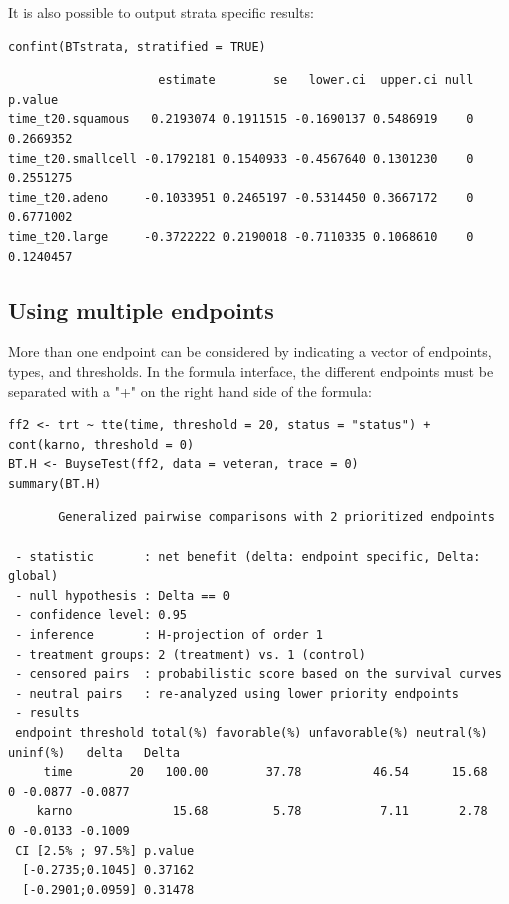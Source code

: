 \documentclass[12pt]{article}
\begin{document}
It is also possible to output strata specific results:
\lstset{language=r,label= ,caption= ,captionpos=b,numbers=none}
\begin{lstlisting}
confint(BTstrata, stratified = TRUE)
\end{lstlisting}

\begin{verbatim}
                     estimate        se   lower.ci  upper.ci null   p.value
time_t20.squamous   0.2193074 0.1911515 -0.1690137 0.5486919    0 0.2669352
time_t20.smallcell -0.1792181 0.1540933 -0.4567640 0.1301230    0 0.2551275
time_t20.adeno     -0.1033951 0.2465197 -0.5314450 0.3667172    0 0.6771002
time_t20.large     -0.3722222 0.2190018 -0.7110335 0.1068610    0 0.1240457
\end{verbatim}


\clearpage


\subsection{Using multiple endpoints}
\label{sec:org0e12525}
More than one endpoint can be considered by indicating a vector of
endpoints, types, and thresholds. In the formula interface, the
different endpoints must be separated with a "+" on the right hand
side of the formula:
\lstset{language=r,label= ,caption= ,captionpos=b,numbers=none}
\begin{lstlisting}
ff2 <- trt ~ tte(time, threshold = 20, status = "status") + cont(karno, threshold = 0)
BT.H <- BuyseTest(ff2, data = veteran, trace = 0)
summary(BT.H)
\end{lstlisting}

\begin{verbatim}
       Generalized pairwise comparisons with 2 prioritized endpoints

 - statistic       : net benefit (delta: endpoint specific, Delta: global) 
 - null hypothesis : Delta == 0 
 - confidence level: 0.95 
 - inference       : H-projection of order 1
 - treatment groups: 2 (treatment) vs. 1 (control) 
 - censored pairs  : probabilistic score based on the survival curves
 - neutral pairs   : re-analyzed using lower priority endpoints
 - results
 endpoint threshold total(%) favorable(%) unfavorable(%) neutral(%) uninf(%)   delta   Delta
     time        20   100.00        37.78          46.54      15.68        0 -0.0877 -0.0877
    karno              15.68         5.78           7.11       2.78        0 -0.0133 -0.1009
 CI [2.5% ; 97.5%] p.value 
  [-0.2735;0.1045] 0.37162 
  [-0.2901;0.0959] 0.31478
\end{verbatim}
\end{document}
